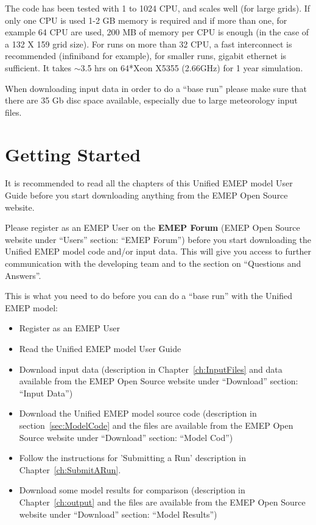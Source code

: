 The code has been tested with 1 to 1024 CPU, and scales well (for large grids).  If only one 
CPU is used 1-2 GB memory is required and if more than one,
for example 64 CPU are used, 200 MB of memory per CPU is enough (in
the case of a 132 X 159 grid size). For runs on more than 32 CPU, a fast interconnect is 
recommended (infiniband for example), for smaller runs, gigabit ethernet is sufficient. 
It takes $\sim$3.5 hrs on 64*Xeon X5355 (2.66GHz) for 1 year simulation.

When downloading input data in order to do a ``base run'' please make
sure that there are 35 Gb disc space available, especially due to
large meteorology input files.

 

\section{Getting Started}


It is recommended to read all the chapters of this Unified EMEP model
User Guide before you start downloading anything from the EMEP Open
Source website.

Please register as an EMEP User on the {\bf EMEP Forum}
(EMEP Open Source website under ``Users'' section: ``EMEP Forum'')
before you start downloading the Unified EMEP model code and/or input
data. This will give you access to further communication with the
developing team and to the section on ``Questions and Answers''. 


This is what you need to do before you can do a ``base run'' with the
Unified EMEP model:

\begin{itemize}
\item Register as an EMEP User
\item Read the Unified EMEP model User Guide
\item
Download input data (description in Chapter~\ref{ch:InputFiles} and
data available from the EMEP Open Source website under ``Download''
section: ``Input Data'')
\item
Download the Unified EMEP model source code (description in 
section~\ref{sec:ModelCode} and the files are available from the EMEP 
Open Source website under ``Download'' section: ``Model Cod'')
\item
Follow the instructions for 'Submitting a Run' description in
Chapter~\ref{ch:SubmitARun}.%
\item
Download some model results for comparison (description in
Chapter~\ref{ch:output} and the files are available from the EMEP 
Open Source website under ``Download'' section: ``Model Results'')
\end{itemize}

